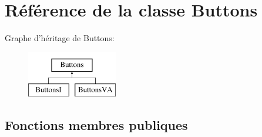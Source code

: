 \hypertarget{classButtons}{\section{Référence de la classe Buttons}
\label{classButtons}
}
Graphe d'héritage de Buttons\+:\begin{figure}[H]
\begin{center}
\leavevmode
\includegraphics[height=2.000000cm]{classButtons}
\end{center}
\end{figure}
\subsection*{Fonctions membres publiques}
